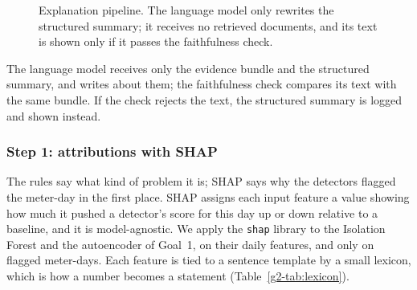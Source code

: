 \begin{figure}[htbp]
\centering
{}
\caption{Explanation pipeline. The language model only rewrites the structured summary; it receives no
retrieved documents, and its text is shown only if it passes the faithfulness check.}
\label{g2-fig:pipeline}
\end{figure}

The language model receives only the evidence bundle and the structured summary, and writes about them; the
faithfulness check compares its text with the same bundle. If the check rejects the text, the structured
summary is logged and shown instead.

\subsubsection*{Step 1: attributions with SHAP}
The rules say what kind of problem it is; SHAP says why the detectors flagged the meter-day in the first
place. SHAP assigns each input feature a value showing how much it pushed a detector's score for this day up
or down relative to a baseline, and it is model-agnostic. We apply the \texttt{shap} library to the Isolation
Forest and the autoencoder of Goal~1, on their daily features, and only on flagged meter-days. Each feature
is tied to a sentence template by a small lexicon, which is how a number becomes a statement
(Table~\ref{g2-tab:lexicon}).

